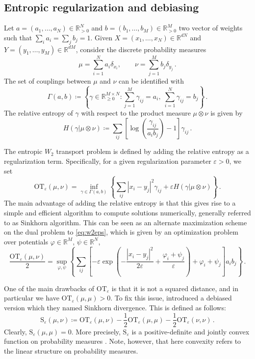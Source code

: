 \documentclass[12pt]{amsart}
\numberwithin{equation}{section}
\let\mr=\mathrm
\theoremstyle{plain}
\theoremstyle{definition}
\begin{document}
\subsection{Entropic regularization and debiasing} \label{sec:entropic}  Let $a = (a_1,\ldots,a_N) \in \mathbb{R}^N_{>0}$ and  $b = (b_1,\ldots,b_M) \in \mathbb{R}^M_{>0}$ two vector of weights such that $\sum_i a_i = \sum_j b_j =1$.
Given $X = (x_1,\ldots,x_N) \in \mathbb{R}^{dN}$ and $Y = (y_1,\ldots,y_M) \in \mathbb{R}^{dM}$, consider the discrete probability measures
\[
\mu = \sum_{i=1}^N a_i \delta_{x_i},
\qquad
\nu = \sum_{j=1}^M b_j \delta_{y_j}\,.
\]
The set of couplings between $\mu$ and $\nu$ can be identified with
\[
\Gamma(a,b)
\coloneqq 
\left\{
\gamma \in \mathbb{R}_{\geq 0}^{M \times N} :
\sum_{j=1}^M \gamma_{ij} = a_i,\;
\sum_{i=1}^N \gamma_{ij} = b_j
\right\}\,.
\]
The relative entropy of $\gamma$ with respect to the product measure $\mu \otimes \nu$ is given by
\[
H(\gamma|\mu \otimes \nu) \coloneqq \sum_{ij} \left[ \log\left(\frac{\gamma_{ij}}{a_i b_j}\right) -1\right] \gamma_{ij}\,.
\]


The entropic \(W_2\) transport problem is defined by adding the relative entropy as a regularization term. Specifically, for a given regularization parameter \(\varepsilon>0\), we set
\begin{equation}\label{eq:w2eps}
 {\mr{OT}}_{\varepsilon}(\mu,\nu) = \inf_{\gamma \in \Gamma(a,b)} \left\{ \sum_{ij} |x_i-y_j|^2 \gamma_{ij} + \varepsilon H(\gamma|\mu \otimes \nu)\right\} \,.
\end{equation}
The main advantage of adding the relative entropy is that this gives rise to a simple and efficient algorithm to compute solutions numerically, generally referred to as Sinkhorn algorithm. This can be seen as an alternate maximization scheme on the dual problem to \eqref{eq:w2eps}, which is given by an optimization problem over potentials $\varphi \in \mathbb{R}^M$, $\psi \in \mathbb{R}^N$,
\begin{equation}\label{eq:dualoteps}
 \frac{{\mr{OT}}_{\varepsilon}(\mu,\nu)}{2} = \sup_{\varphi,\psi}\left\{ \sum_{ij}\left[ - \varepsilon\exp\left( - \frac{|x_i -y_j|^2}{2\varepsilon} + \frac{\varphi_i +\psi_j}{\varepsilon} \right) + \varphi_i  + \psi_j \right]a_i b_j  \right\}\,.
\end{equation}

One of the main drawbacks of $\mr{OT}_{\varepsilon}$ is that it is not a squared distance, and in particular we have $\mr{OT}_{\varepsilon}(\mu,\mu)>0$. To fix this issue, \cite{genevay2018learning} introduced a debiased version which they named Sinkhorn divergence. This is defined as follows:
\[
\mr{S}_\varepsilon(\mu,\nu) \coloneqq  \mr{OT}_\varepsilon(\mu,\nu) - \frac{ 1}2\mr{OT}_\varepsilon(\mu,\mu)  - \frac{ 1}2 \mr{OT}_\varepsilon(\nu,\nu) \,.
\]
Clearly, $\mr{S}_\varepsilon(\mu,\mu) =0$. More precisely, $\mr{S}_\varepsilon$ is a positive-definite and jointly convex function on probability measures \cite{feydy2019interpolating}. Note, however, that here convexity refers to the linear structure on probability measures.
\end{document}
